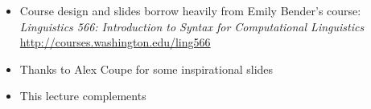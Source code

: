 \documentclass[a4paper,landscape,headrule,footrule]{foils}
\begin{document}

\begin{itemize}
\item Course design and slides borrow heavily from Emily Bender's course:
\textit{Linguistics 566: Introduction to Syntax for Computational Linguistics}
\\ \url{http://courses.washington.edu/ling566}
\item Thanks to Alex Coupe for some inspirational slides
\item This lecture complements \citet[Chapter 2]{sag:wasow:bender:2003}
\end{itemize}



\end{document}
